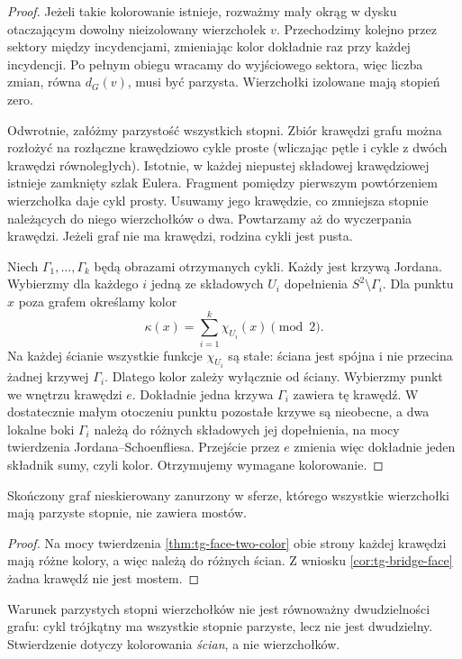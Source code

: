 \begin{proof}
Jeżeli takie kolorowanie istnieje, rozważmy mały okrąg
w dysku otaczającym dowolny nieizolowany wierzchołek $v$.
Przechodzimy kolejno przez sektory między incydencjami,
zmieniając kolor dokładnie raz przy każdej incydencji.
Po pełnym obiegu wracamy do wyjściowego sektora, więc
liczba zmian, równa $d_G(v)$, musi być parzysta.
Wierzchołki izolowane mają stopień zero.

Odwrotnie, załóżmy parzystość wszystkich stopni.
Zbiór krawędzi grafu można rozłożyć na rozłączne
krawędziowo cykle proste (wliczając pętle i cykle
z dwóch krawędzi równoległych). Istotnie, w każdej
niepustej składowej krawędziowej istnieje zamknięty
szlak Eulera. Fragment pomiędzy pierwszym powtórzeniem
wierzchołka daje cykl prosty. Usuwamy jego krawędzie,
co zmniejsza stopnie należących do niego wierzchołków
o dwa. Powtarzamy aż do wyczerpania krawędzi.
Jeżeli graf nie ma krawędzi, rodzina cykli jest pusta.

Niech $\Gamma_1,\ldots,\Gamma_k$ będą obrazami
otrzymanych cykli. Każdy jest krzywą Jordana.
Wybierzmy dla każdego $i$ jedną ze składowych $U_i$
dopełnienia $S^2\setminus\Gamma_i$. Dla punktu
$x$ poza grafem określamy kolor
\[
\kappa(x)=\sum_{i=1}^k\chi_{U_i}(x)\pmod 2.
\]
Na każdej ścianie wszystkie funkcje $\chi_{U_i}$
są stałe: ściana jest spójna i nie przecina żadnej
krzywej $\Gamma_i$. Dlatego kolor zależy wyłącznie
od ściany. Wybierzmy punkt we wnętrzu krawędzi $e$.
Dokładnie jedna krzywa $\Gamma_i$ zawiera tę krawędź.
W dostatecznie małym otoczeniu punktu pozostałe krzywe
są nieobecne, a dwa lokalne boki $\Gamma_i$ należą
do różnych składowych jej dopełnienia, na mocy
twierdzenia Jordana--Schoenfliesa. Przejście przez $e$
zmienia więc dokładnie jeden składnik sumy, czyli kolor.
Otrzymujemy wymagane kolorowanie.
\end{proof}

\begin{wniosek}
Skończony graf nieskierowany zanurzony w sferze, którego
wszystkie wierzchołki mają parzyste stopnie,
nie zawiera mostów.
\end{wniosek}
\begin{proof}
Na mocy twierdzenia \ref{thm:tg-face-two-color}
obie strony każdej krawędzi mają różne kolory,
a więc należą do różnych ścian. Z wniosku
\ref{cor:tg-bridge-face} żadna krawędź nie jest mostem.
\end{proof}



\begin{uwaga}
Warunek parzystych stopni wierzchołków nie jest równoważny
dwudzielności grafu: cykl trójkątny ma wszystkie stopnie
parzyste, lecz nie jest dwudzielny. Stwierdzenie dotyczy
kolorowania \emph{ścian}, a nie wierzchołków.
\end{uwaga}

